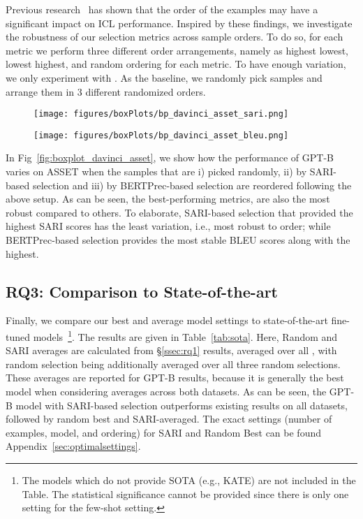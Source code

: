 \documentclass[11pt]{article}
\begin{document}
Previous research~\citep{lu-etal-2022-fantastically} has shown that the order of the examples may have a significant impact on ICL performance.  Inspired by these findings, we investigate the robustness of our selection metrics across sample orders. To do so, for each metric we perform three different order arrangements, namely as highest  lowest, lowest  highest, and random ordering for each metric. To have enough variation, we only experiment with . As the baseline, we randomly pick samples and arrange them in 3 different randomized orders. \begin{figure*}[]
    \centering
    \begin{subfigure}[b]{0.47\textwidth} \texttt{[image: figures/boxPlots/bp\_davinci\_asset\_sari.png]}
    \end{subfigure}
\begin{subfigure}[b]{0.47\textwidth}
       \texttt{[image: figures/boxPlots/bp\_davinci\_asset\_bleu.png]}
    \end{subfigure}
    \caption{Boxplots for GPT-B model performance on ASSET with sample (re)ordering via random, SARI-based and BERTPrec-based selections. Performance shown in SARI (left), and BLEU (right) }
    \label{fig:boxplot_davinci_asset}
\end{figure*}

In Fig~\ref{fig:boxplot_davinci_asset}, we show how the performance of GPT-B varies on ASSET when the samples that are i) picked randomly, ii) by SARI-based selection and iii) by BERTPrec-based selection are reordered following the above setup. As can be seen, the best-performing metrics, are also the most robust compared to others. To elaborate, SARI-based selection that provided the highest SARI scores has the least variation, i.e., most robust to order; while BERTPrec-based selection provides the most stable BLEU scores along with the highest.  




\subsection{RQ3: Comparison to State-of-the-art}
\label{ssec:rq3}
Finally, we compare our best and average model settings to state-of-the-art fine-tuned models~\footnote{The models which do not provide SOTA (e.g., KATE) are not included in the Table. The statistical significance cannot be provided since there is only one setting for the few-shot setting.}. The results are given in Table~\ref{tab:sota}. Here, Random and SARI averages are calculated from \S\ref{ssec:rq1} results, averaged over all , with random selection being additionally averaged over all three random selections. These averages are reported for GPT-B results, because it is generally the best model when considering averages across both datasets. As can be seen, the GPT-B model with SARI-based selection outperforms existing results on all datasets, followed by random best and SARI-averaged. The exact settings (number of examples, model, and ordering) for SARI and Random Best can be found Appendix~\ref{sec:optimalsettings}.
\end{document}
